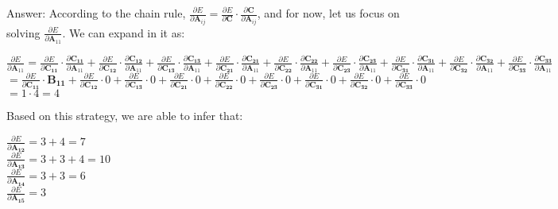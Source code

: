 \documentclass[12pt,letterpaper]{article}
\newcommand{\matr}[1]{\bm{#1}}     %
\begin{document}
\begin{itemize}
 Answer: According to the chain rule, $\frac{\partial E}{\partial \matr{A}_{ij}} = \frac{\partial E}{\partial \matr{C}}\cdot \frac{\partial \matr{C}}{\partial \matr{A}_{ij}}$, and for now, let us focus on solving $\frac{\partial E}{\partial \matr{A}_{11}}$. We can expand in it as:
 \begin{center}
     $
     \frac{\partial E}{\partial \matr{A}_{11}} =
     \frac{\partial E}{\partial \matr{C_{11}}}\cdot \frac{\partial \matr{C_{11}}}{\partial \matr{A}_{11}} + 
     \frac{\partial E}{\partial \matr{C_{12}}}\cdot \frac{\partial \matr{C_{12}}}{\partial \matr{A}_{11}} +
     \frac{\partial E}{\partial \matr{C_{13}}}\cdot \frac{\partial \matr{C_{13}}}{\partial \matr{A}_{11}} +
     \frac{\partial E}{\partial \matr{C_{21}}}\cdot \frac{\partial \matr{C_{21}}}{\partial \matr{A}_{11}} +
     \frac{\partial E}{\partial \matr{C_{22}}}\cdot \frac{\partial \matr{C_{22}}}{\partial \matr{A}_{11}} +
     \frac{\partial E}{\partial \matr{C_{23}}}\cdot \frac{\partial \matr{C_{23}}}{\partial \matr{A}_{11}} +
     \frac{\partial E}{\partial \matr{C_{31}}}\cdot \frac{\partial \matr{C_{31}}}{\partial \matr{A}_{11}} +
     \frac{\partial E}{\partial \matr{C_{32}}}\cdot \frac{\partial \matr{C_{32}}}{\partial \matr{A}_{11}} +
     \frac{\partial E}{\partial \matr{C_{33}}}\cdot \frac{\partial \matr{C_{33}}}{\partial \matr{A}_{11}} 
     $\\
     $
     = \frac{\partial E}{\partial \matr{C_{11}}}\cdot
     \matr{B_{11}} + 
     \frac{\partial E}{\partial \matr{C_{12}}}\cdot 0 +
     \frac{\partial E}{\partial \matr{C_{13}}}\cdot 0 +
     \frac{\partial E}{\partial \matr{C_{21}}}\cdot 0 +
     \frac{\partial E}{\partial \matr{C_{22}}}\cdot 0 +
     \frac{\partial E}{\partial \matr{C_{23}}}\cdot 0 +
     \frac{\partial E}{\partial \matr{C_{31}}}\cdot 0 +
     \frac{\partial E}{\partial \matr{C_{32}}}\cdot 0 +
     \frac{\partial E}{\partial \matr{C_{33}}}\cdot 0
     $\\
     $
     = 1 \cdot 4 = 4
     $
 \end{center}Based on this strategy, we are able to infer that:
 \begin{center}
     $
     \frac{\partial E}{\partial \matr{A_{12}}} = 3 + 4 = 7
     $\\
     $
     \frac{\partial E}{\partial \matr{A_{13}}} = 3 + 3 + 4 = 10 
     $\\
     $
     \frac{\partial E}{\partial \matr{A_{14}}} = 3 + 3 = 6 
     $\\
     $
     \frac{\partial E}{\partial \matr{A_{15}}} = 3 
     $\\

\end{center}
\end{itemize}
\end{document}

